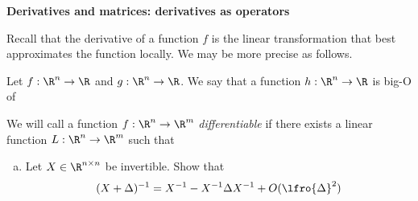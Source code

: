 \item {} \textbf{Derivatives and matrices: derivatives as operators}

  Recall that the derivative of a function $f$ is the linear transformation
  that best approximates the function locally. We may be more precise
  as follows.

  Let $f : \R^n \to \R$ and $g : \R^n \to \R$.
  We say that a function $h : \R^n \to \R$ is big-O of 

  We will call a function $f : \R^n \to \R^m$ \emph{differentiable}
  if there exists a linear function $L : \R^n \to \R^m$ such that

  \begin{enumerate}[(a)]
  \item Let $X \in \R^{n \times n}$ be invertible. Show that
    \begin{equation*}
      (X + \Delta)^{-1}
      = X^{-1} - X^{-1} \Delta X^{-1} + O(\lfro{\Delta}^2)
    \end{equation*}

  \end{enumerate}

